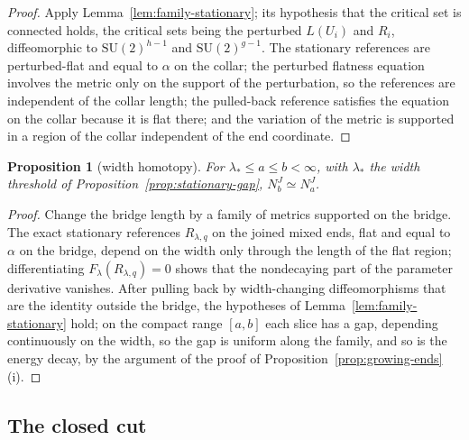 \documentclass[11pt]{amsart}
\newtheorem{proposition}[theorem]{Proposition}
\theoremstyle{definition}
\theoremstyle{remark}
\theoremstyle{plain}
\numberwithin{equation}{section}
\newcommand{\SU}{\mathrm{SU}}
\begin{document}
\begin{proof}
Apply Lemma~\ref{lem:family-stationary}; its hypothesis that the critical set is
connected holds, the critical sets being the perturbed $L(U_i)$ and $R_i$,
diffeomorphic to $\SU(2)^{h-1}$ and $\SU(2)^{g-1}$. The stationary references are
perturbed-flat and equal to $\alpha$ on the collar; the perturbed flatness equation
involves the metric only on the support of the perturbation, so the references
are independent of the collar length; the pulled-back reference satisfies the
equation on the collar because it is flat there; and the variation of the metric
is supported in a region of the collar independent of the end coordinate.
\end{proof}

\begin{proposition}[width homotopy]\label{prop:width}
For $\lambda_*\le a\le b<\infty$, with $\lambda_*$ the width threshold of
Proposition~\ref{prop:stationary-gap}, $N^J_b\simeq N^J_a$.
\end{proposition}

\begin{proof}
Change the bridge length by a family of metrics supported on the bridge. The
exact stationary references $R_{\lambda,q}$ on the joined mixed ends, flat and equal
to $\alpha$ on the bridge, depend on the width only through the length of the flat
region; differentiating $F_\lambda(R_{\lambda,q})=0$ shows that the nondecaying part of the parameter derivative vanishes. After pulling back by width-changing diffeomorphisms
that are the identity outside the bridge, the hypotheses of
Lemma~\ref{lem:family-stationary} hold; on the compact range $[a,b]$ each slice has a
gap, depending continuously on the width, so the gap is uniform along the family, and so is
the energy decay, by the argument of the proof of Proposition~\ref{prop:growing-ends}(i).
\end{proof}

\subsection{The closed cut}\label{subsec:closed-cut}
\end{document}
